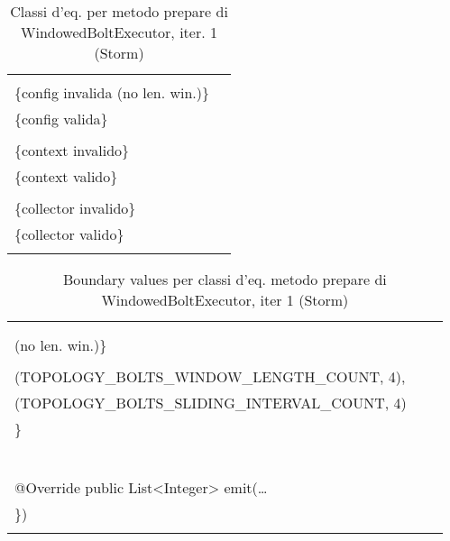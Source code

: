 \documentclass[10pt, a4paper]{article}
\newcommand{\Intmaketable}[4]{
	\begin{longtable}{#3}
	#4
	\caption{#2}
	\label{#1}
	\end{longtable}
}
\newcommand{\Intceqtable}[3]{
	\Intmaketable{#1}{#2}{|l|l|}{
	\hline
	\thead{Parametro formale} & \thead{Classi d'equivalenza} \\
	\hline
	\hline
	#3
	\hline}
}
\newcommand{\Intbvtable}[3]{
	\Intmaketable{#1}{#2}{|l|l|l|}{
	\hline
	\thead{Parametro formale} & \thead{Classe d'equivalenza} & \thead{Boundary value}\\
	\hline
	\hline
	#3
	\hline}
}
\newcommand{\Intceqcaption}[4]{Classi d'eq. per metodo #1 di #2, iter. #3 (#4)}
\newcommand{\Intbvcaption}[4]{Boundary values per classi d'eq. metodo #1 di #2, iter #3 (#4)}
\newcommand{\gettablelabel}[5]{table:#1:#2:#3:iter#4:proj#5}
\newcommand{\ceqtable}[5]{
	\Intceqtable{\gettablelabel{ceq}{#1}{#2}{#3}{#4}}
		{\Intceqcaption{#1}{#2}{#3}{#4}}
		{#5}
}
\newcommand{\bvtable}[5]{
	\Intbvtable{\gettablelabel{bv}{#1}{#2}{#3}{#4}}
		{\Intbvcaption{#1}{#2}{#3}{#4}}
		{#5}
}
\newcommand{\tcell}{\makecell[tl]}
\newcommand{\newtrow}{\\ \hline}
\def\storm{Storm}
\newcommand{\ceq}[1]{\{#1\}}
\begin{document}
	
	\ceqtable{prepare}{WindowedBoltExecutor}{1}{\storm}{
			\tcell{topoConf} &
			\tcell{\ceq{null}\\\ceq{config invalida (no len. win.)}\\\ceq{config valida}}
		\newtrow
			\tcell{context} &
			\tcell{\ceq{null}\\\ceq{context invalido}\\\ceq{context valido}}
		\newtrow
			\tcell{collector} &
			\tcell{\ceq{null}\\\ceq{collector invalido}\\\ceq{collector valido}}
		\newtrow
	}
	
	\bvtable{prepare}{WindowedBoltExecutor}{1}{\storm}{
			\tcell{topoConf} &
			\tcell{\ceq{null}} &
			\tcell{null}
		\newtrow
			\tcell{topoConf} &
			\tcell{\ceq{config invalida\\ (no len. win.)}} &
			\tcell{Map\{\}}
		\newtrow
			\tcell{topoConf} &
			\tcell{\ceq{config valida}} &
			\tcell{Map\{\\\;\;(TOPOLOGY\_BOLTS\_WINDOW\_LENGTH\_COUNT, 4),\\\;\;(TOPOLOGY\_BOLTS\_SLIDING\_INTERVAL\_COUNT, 4)\\\}}
		\newtrow
			\tcell{context} &
			\tcell{\ceq{null}} &
			\tcell{null}
		\newtrow
			\tcell{context} &
			\tcell{\ceq{context valido}} &
			\tcell{mock(TopologyContext.class)}
		\newtrow
			\tcell{context} &
			\tcell{\ceq{context invalido}} &
			\tcell{new TopologyContext(null,\dots,null)}
		\newtrow
			\tcell{collector} &
			\tcell{\ceq{null}} &
			\tcell{null}
		\newtrow
			\tcell{collector} &
			\tcell{\ceq{collector invalido}} &
			\tcell{new OutputCollector(null)}
		\newtrow
			\tcell{collector} &
			\tcell{\ceq{collector valido}} &
			\tcell{new OutputCollector(new IOutputCollector() \{\\\;\;@Override public List<Integer> emit(\dots\\\})}
		\newtrow
	}
	
	\newpage
	
\end{document}
